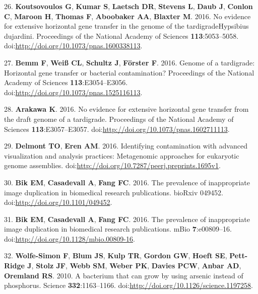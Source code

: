 \documentclass[11pt,]{article}
\begin{document}
26. \textbf{Koutsovoulos G}, \textbf{Kumar S}, \textbf{Laetsch DR},
\textbf{Stevens L}, \textbf{Daub J}, \textbf{Conlon C}, \textbf{Maroon
H}, \textbf{Thomas F}, \textbf{Aboobaker AA}, \textbf{Blaxter M}. 2016.
No evidence for extensive horizontal gene transfer in the genome of the
tardigradeHypsibius dujardini. Proceedings of the National Academy of
Sciences \textbf{113}:5053--5058.
doi:\url{http://doi.org/10.1073/pnas.1600338113}.

27. \textbf{Bemm F}, \textbf{Weiß CL}, \textbf{Schultz J},
\textbf{Förster F}. 2016. Genome of a tardigrade: Horizontal gene
transfer or bacterial contamination? Proceedings of the National Academy
of Sciences \textbf{113}:E3054--E3056.
doi:\url{http://doi.org/10.1073/pnas.1525116113}.

28. \textbf{Arakawa K}. 2016. No evidence for extensive horizontal gene
transfer from the draft genome of a tardigrade. Proceedings of the
National Academy of Sciences \textbf{113}:E3057--E3057.
doi:\url{http://doi.org/10.1073/pnas.1602711113}.

29. \textbf{Delmont TO}, \textbf{Eren AM}. 2016. Identifying
contamination with advanced visualization and analysis practices:
Metagenomic approaches for eukaryotic genome assemblies.
doi:\url{http://doi.org/10.7287/peerj.preprints.1695v1}.

30. \textbf{Bik EM}, \textbf{Casadevall A}, \textbf{Fang FC}. 2016. The
prevalence of inappropriate image duplication in biomedical research
publications. bioRxiv 049452. doi:\url{http://doi.org/10.1101/049452}.

31. \textbf{Bik EM}, \textbf{Casadevall A}, \textbf{Fang FC}. 2016. The
prevalence of inappropriate image duplication in biomedical research
publications. mBio \textbf{7}:e00809--16.
doi:\url{http://doi.org/10.1128/mbio.00809-16}.

32. \textbf{Wolfe-Simon F}, \textbf{Blum JS}, \textbf{Kulp TR},
\textbf{Gordon GW}, \textbf{Hoeft SE}, \textbf{Pett-Ridge J},
\textbf{Stolz JF}, \textbf{Webb SM}, \textbf{Weber PK}, \textbf{Davies
PCW}, \textbf{Anbar AD}, \textbf{Oremland RS}. 2010. A bacterium that
can grow by using arsenic instead of phosphorus. Science
\textbf{332}:1163--1166.
doi:\url{http://doi.org/10.1126/science.1197258}.
\end{document}
